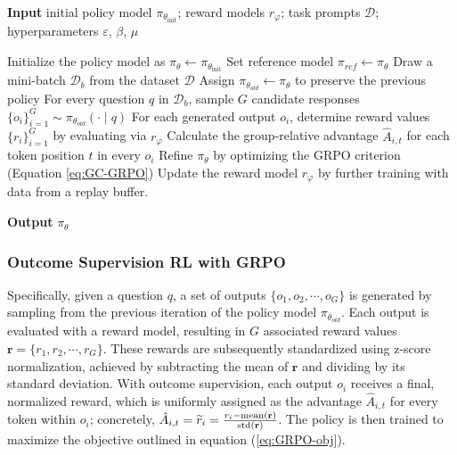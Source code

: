 \begin{itemize}[topsep=0pt]
\begin{algorithm}[t]
  \small
  \caption{Iterative Group Relative Policy Optimization}
  \textbf{Input} initial policy model $\pi_{\theta_{\text{init}}}$; reward models $r_\varphi$; task prompts $\mathcal{D}$; 
  hyperparameters $\varepsilon$, $\beta$, $\mu$
  \begin{algorithmic}[1]
    \State Initialize the policy model as $\pi_\theta \leftarrow \pi_{\theta_{\text{init}}}$
       \State Set reference model $\pi_{ref} \leftarrow \pi_{\theta}$
      \State Draw a mini-batch $\mathcal{D}_b$ from the dataset $\mathcal{D}$
      \State Assign $\pi_{\theta_{old}} \leftarrow \pi_{\theta}$ to preserve the previous policy
      \State For every question $q$ in $\mathcal{D}_b$, sample $G$ candidate responses $\{o_i\}_{i=1}^G \sim \pi_{\theta_{old}} (\cdot \mid q)$
      \State For each generated output $o_i$, determine reward values $\{r_i\}_{i=1}^{G}$ by evaluating via $r_{\varphi}$
      \State Calculate the group-relative advantage $\hat{A}_{i,t}$ for each token position $t$ in every $o_i$
        \State Refine $\pi_\theta$ by optimizing the GRPO criterion (Equation \ref{eq:GC-GRPO})
      \EndFor
    \EndFor 
    \State Update the reward model $r_\varphi$ by further training with data from a replay buffer. 
    \EndFor 
  \end{algorithmic}
  \textbf{Output} $\pi_\theta$
  \label{alg:iter-grpo}
\end{algorithm}

\subsubsection{Outcome Supervision RL with GRPO} Specifically, given a question $q$, a set of outputs $\{o_1, o_2, \cdots, o_G\}$ is generated by sampling from the previous iteration of the policy model $\pi_{\theta_{old}}$. Each output is evaluated with a reward model, resulting in $G$ associated reward values $\mathbf{r} = \{r_1, r_2, \cdots, r_G\}$. These rewards are subsequently standardized using z-score normalization, achieved by subtracting the mean of $\mathbf{r}$ and dividing by its standard deviation. With outcome supervision, each output $o_i$ receives a final, normalized reward, which is uniformly assigned as the advantage $\hat{A}_{i, t}$ for every token within $o_i$; concretely, $\hat{A}_{i, t} = \widetilde{r}_i = \frac{r_i - {\rm mean}(\mathbf{r})}{{\rm std}(\mathbf{r})}$. The policy is then trained to maximize the objective outlined in equation (\ref{eq:GRPO-obj}).


\end{itemize}
